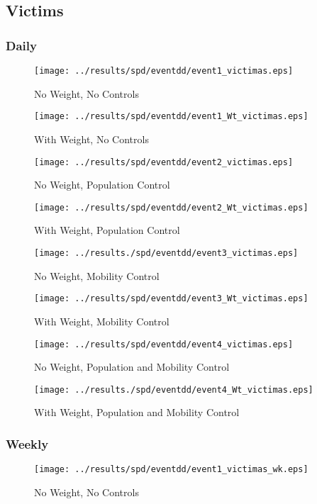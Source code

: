 \documentclass[11pt,letterpaper]{article}
\begin{document}
	\subsection{Victims}
		\subsubsection{Daily}
\begin{figure}[H]
\caption{No Weight, No Controls}
\centering
\texttt{[image: ../results/spd/eventdd/event1\_victimas.eps]}
\end{figure}

\begin{figure}[H]
\caption{With Weight, No Controls}
\centering
\texttt{[image: ../results/spd/eventdd/event1\_Wt\_victimas.eps]}
\end{figure}
\begin{figure}[H]
\caption{No Weight, Population Control}
\centering
\texttt{[image: ../results/spd/eventdd/event2\_victimas.eps]}
\end{figure}

\begin{figure}[H]
\caption{With Weight, Population Control}
\centering
\texttt{[image: ../results/spd/eventdd/event2\_Wt\_victimas.eps]}
\end{figure}
\begin{figure}[H]
\caption{No Weight, Mobility Control}
\centering
\texttt{[image: ../results./spd/eventdd/event3\_victimas.eps]}
\end{figure}

\begin{figure}[H]
\caption{With Weight, Mobility Control}
\centering
\texttt{[image: ../results/spd/eventdd/event3\_Wt\_victimas.eps]}
\end{figure}
\begin{figure}[H]
\caption{No Weight, Population and Mobility Control}
\centering
\texttt{[image: ../results/spd/eventdd/event4\_victimas.eps]}
\end{figure}

\begin{figure}[H]
\caption{With Weight, Population and Mobility Control}
\centering
\texttt{[image: ../results./spd/eventdd/event4\_Wt\_victimas.eps]}
\end{figure}

		\subsubsection{Weekly}
\begin{figure}[H]
\caption{No Weight, No Controls}
\centering
\texttt{[image: ../results/spd/eventdd/event1\_victimas\_wk.eps]}
\end{figure}
\end{document}
